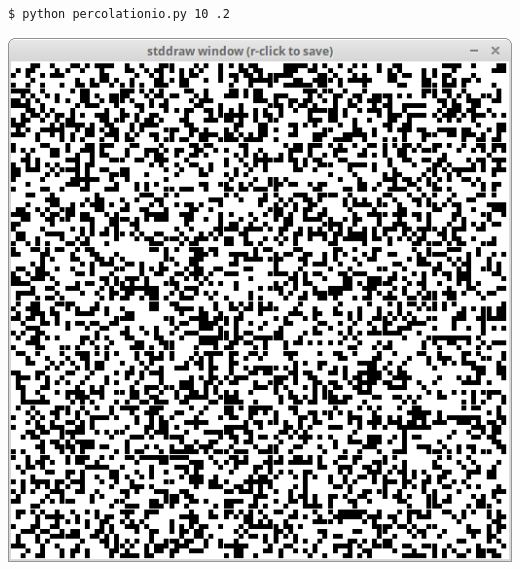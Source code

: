 \documentclass[8pt,a4paper,compress,handout]{beamer}
\begin{document}
\begin{frame}[fragile]
\begin{minipage}{160pt}
\begin{lstlisting}[language={}]
$ python percolationio.py 10 .2
\end{lstlisting}
\end{minipage}%
\begin{minipage}{140pt}
\hfill \includegraphics[scale=0.15]{figures/percolation3.png}
\end{minipage}

\smallskip


\end{frame}
\end{document}
